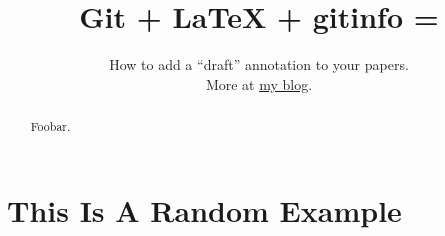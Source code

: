 \documentclass{imports/sig-alternate}
\begin{document}
\title{Git + LaTeX + gitinfo = {\Huge \Heart}}
\subtitle{How to add a ``draft'' annotation to your papers. \\
More at \href{https://balist.es/blog/2016/11/02/git-latex-gitinfo-draft-watermark/}{my blog}.}

\maketitle

\begin{abstract}

Foobar.

\end{abstract}

\section{This Is A Random Example}

\blindmathpaper
\end{document}
